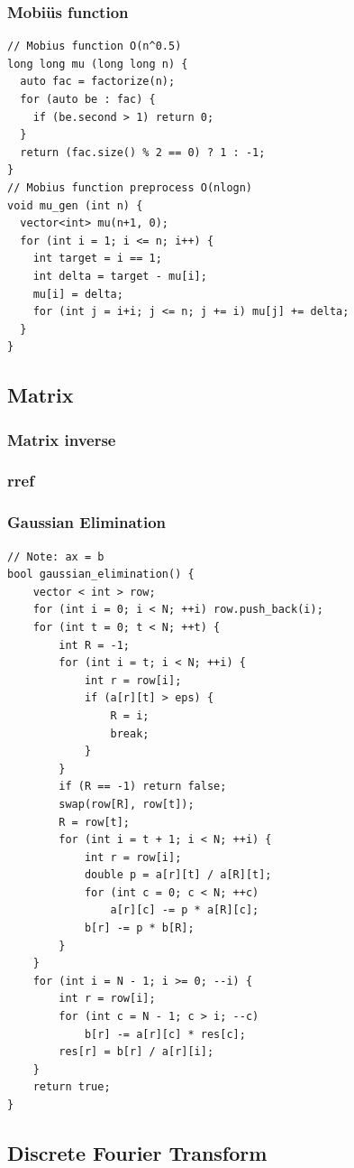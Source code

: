 \documentclass[10pt,letterpaper,landscape]{article}
\begin{document}
\begin{multicols}{2}
\subsubsection{Mobi\"us function}
\begin{lstlisting}
// Mobius function O(n^0.5)
long long mu (long long n) {
  auto fac = factorize(n);
  for (auto be : fac) {
    if (be.second > 1) return 0;
  }
  return (fac.size() % 2 == 0) ? 1 : -1;
}
// Mobius function preprocess O(nlogn)
void mu_gen (int n) {
  vector<int> mu(n+1, 0);
  for (int i = 1; i <= n; i++) {
    int target = i == 1;
    int delta = target - mu[i];
    mu[i] = delta;
    for (int j = i+i; j <= n; j += i) mu[j] += delta;
  }
}
\end{lstlisting}
\subsection{Matrix}
\subsubsection{Matrix inverse}
\subsubsection{rref}
\subsubsection{Gaussian Elimination}
\begin{lstlisting}
// Note: ax = b
bool gaussian_elimination() {
    vector < int > row;
    for (int i = 0; i < N; ++i) row.push_back(i);
    for (int t = 0; t < N; ++t) {
        int R = -1;
        for (int i = t; i < N; ++i) {
            int r = row[i];
            if (a[r][t] > eps) {
                R = i;
                break;
            }
        }
        if (R == -1) return false;
        swap(row[R], row[t]);
        R = row[t];
        for (int i = t + 1; i < N; ++i) {
            int r = row[i];
            double p = a[r][t] / a[R][t];
            for (int c = 0; c < N; ++c)
                a[r][c] -= p * a[R][c];
            b[r] -= p * b[R];
        }
    }
    for (int i = N - 1; i >= 0; --i) {
        int r = row[i];
        for (int c = N - 1; c > i; --c)
            b[r] -= a[r][c] * res[c];
        res[r] = b[r] / a[r][i];
    }
    return true;
}
\end{lstlisting}
\subsection{Discrete Fourier Transform}

\end{multicols}
\end{document}

